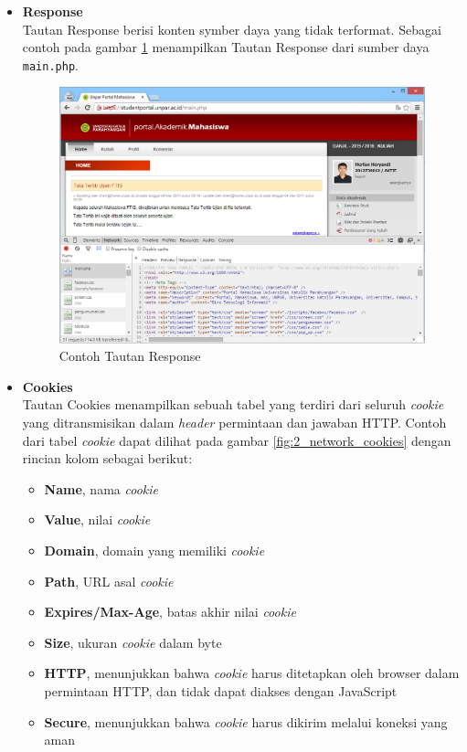 \documentclass[a4paper,twoside]{article}
\begin{document}
\begin{enumerate}
\begin{enumerate}
\begin{itemize}
	\item \textbf{Response}\\
	Tautan Response berisi konten symber daya yang tidak terformat. Sebagai contoh pada gambar \ref{fig:2_network_response} menampilkan Tautan Response dari sumber daya \texttt{main.php}.
\begin{figure}[H]
	\centering
	\includegraphics[scale=0.5]{Gambar/network-response}
	\caption{Contoh Tautan Response} 
	\label{fig:2_network_response}
\end{figure}

	\item \textbf{Cookies}\\
	Tautan Cookies menampilkan sebuah tabel yang terdiri dari seluruh \textit{cookie} yang ditransmisikan dalam \textit{header} permintaan dan jawaban HTTP. Contoh dari tabel \textit{cookie} dapat dilihat pada gambar \ref{fig:2_network_cookies} dengan rincian kolom sebagai berikut:
	\begin{itemize}
		\item \textbf{Name}, nama \textit{cookie}
		\item \textbf{Value}, nilai \textit{cookie}
		\item \textbf{Domain}, domain yang memiliki \textit{cookie}
		\item \textbf{Path}, URL asal \textit{cookie}
		\item \textbf{Expires/Max-Age}, batas akhir nilai \textit{cookie}
		\item \textbf{Size}, ukuran \textit{cookie} dalam byte
		\item \textbf{HTTP}, menunjukkan bahwa \textit{cookie} harus ditetapkan oleh browser dalam permintaan HTTP, dan tidak dapat diakses dengan JavaScript
		\item \textbf{Secure}, menunjukkan bahwa \textit{cookie} harus dikirim melalui koneksi yang aman
	\end{itemize}
	

\end{itemize}
\end{enumerate}
\end{enumerate}
\end{document}
